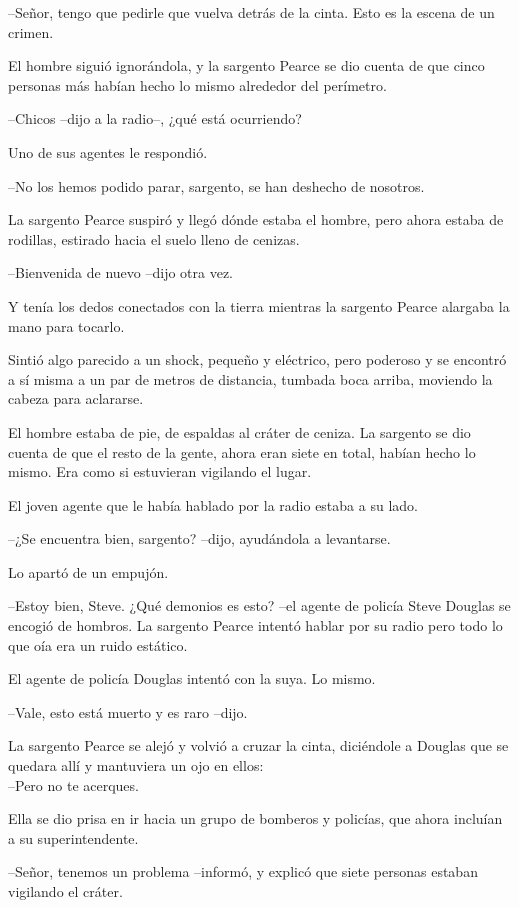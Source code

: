 --Señor, tengo que pedirle que vuelva detrás de la cinta. Esto es la
escena de un crimen.

El hombre siguió ignorándola, y la sargento Pearce se dio cuenta de que
cinco personas más habían hecho lo mismo alrededor del perímetro.

--Chicos --dijo a la radio--, ¿qué está ocurriendo?

Uno de sus agentes le respondió.

--No los hemos podido parar, sargento, se han deshecho de nosotros.

La sargento Pearce suspiró y llegó dónde estaba el hombre, pero ahora
estaba de rodillas, estirado hacia el suelo lleno de cenizas.

--Bienvenida de nuevo --dijo otra vez.

Y tenía los dedos conectados con la tierra mientras la sargento Pearce
alargaba la mano para tocarlo.

Sintió algo parecido a un shock, pequeño y eléctrico, pero poderoso y se
encontró a sí misma a un par de metros de distancia, tumbada boca
arriba, moviendo la cabeza para aclararse.

El hombre estaba de pie, de espaldas al cráter de ceniza. La sargento se
dio cuenta de que el resto de la gente, ahora eran siete en total,
habían hecho lo mismo. Era como si estuvieran vigilando el lugar.

El joven agente que le había hablado por la radio estaba a su lado.

--¿Se encuentra bien, sargento? --dijo, ayudándola a levantarse.

Lo apartó de un empujón.

--Estoy bien, Steve. ¿Qué demonios es esto? --el agente de policía Steve
Douglas se encogió de hombros. La sargento Pearce intentó hablar por su
radio pero todo lo que oía era un ruido estático.

El agente de policía Douglas intentó con la suya. Lo mismo.

--Vale, esto está muerto y es raro --dijo.

La sargento Pearce se alejó y volvió a cruzar la cinta, diciéndole a
Douglas que se quedara allí y mantuviera un ojo en ellos:\\--Pero no te
acerques.

Ella se dio prisa en ir hacia un grupo de bomberos y policías, que ahora
incluían a su superintendente.

--Señor, tenemos un problema --informó, y explicó que siete personas
estaban vigilando el cráter.

